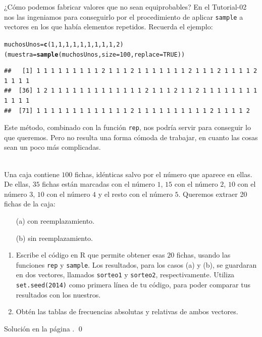 \documentclass[10pt,a4paper]{article}\usepackage[]{graphicx}\usepackage[]{color}
\makeatletter
\newcommand{\hlnum}[1]{\textcolor[rgb]{0.686,0.059,0.569}{#1}}%
\newcommand{\hlstd}[1]{\textcolor[rgb]{0.345,0.345,0.345}{#1}}%
\newcommand{\hlkwb}[1]{\textcolor[rgb]{0.69,0.353,0.396}{#1}}%
\newcommand{\hlkwc}[1]{\textcolor[rgb]{0.333,0.667,0.333}{#1}}%
\newcommand{\hlkwd}[1]{\textcolor[rgb]{0.737,0.353,0.396}{\textbf{#1}}}%
\newenvironment{kframe}{%
 \def\at@end@of@kframe{}%
 \ifinner\ifhmode%
  \def\at@end@of@kframe{\end{minipage}}%
  \begin{minipage}{\columnwidth}%
 \fi\fi%
 \def\FrameCommand##1{\hskip\@totalleftmargin \hskip-\fboxsep
 \colorbox{shadecolor}{##1}\hskip-\fboxsep
     \hskip-\linewidth \hskip-\@totalleftmargin \hskip\columnwidth}%
 \MakeFramed {\advance\hsize-\width
   \@totalleftmargin\z@ \linewidth\hsize
   \@setminipage}}%
 {\par\unskip\endMakeFramed%
 \at@end@of@kframe}
\newenvironment{knitrout}{}{} %
\newcounter {cont01}
\makeatother
\begin{document}
¿Cómo podemos fabricar valores que no sean equiprobables? En el Tutorial-02 nos las ingeniamos para conseguirlo por el procedimiento de aplicar {\tt sample} a vectores en los que había elementos repetidos. Recuerda el ejemplo:
\begin{knitrout}
\color{fgcolor}\begin{kframe}
\begin{alltt}
\hlstd{muchosUnos} \hlkwb{=} \hlkwd{c}\hlstd{(}\hlnum{1}\hlstd{,}\hlnum{1}\hlstd{,}\hlnum{1}\hlstd{,}\hlnum{1}\hlstd{,}\hlnum{1}\hlstd{,}\hlnum{1}\hlstd{,}\hlnum{1}\hlstd{,}\hlnum{1}\hlstd{,}\hlnum{1}\hlstd{,}\hlnum{2}\hlstd{)}
\hlstd{(muestra} \hlkwb{=} \hlkwd{sample}\hlstd{(muchosUnos,} \hlkwc{size}\hlstd{=}\hlnum{100}\hlstd{,} \hlkwc{replace}\hlstd{=}\hlnum{TRUE}\hlstd{) )}
\end{alltt}
\begin{verbatim}
##   [1] 1 1 1 1 1 1 1 1 1 2 1 1 1 2 1 1 1 1 1 1 1 2 1 1 1 2 1 1 1 1 2 1 1 1 1
##  [36] 1 2 1 1 1 1 1 1 1 1 1 1 1 1 1 2 1 1 1 2 1 1 2 1 1 1 1 1 1 1 1 1 1 1 1
##  [71] 1 1 1 1 1 1 1 1 1 1 1 1 1 2 1 1 1 1 1 1 1 1 1 1 2 1 1 1 1 2
\end{verbatim}
\end{kframe}
\end{knitrout}
     
Este método, combinado con la función {\tt rep}, nos podría servir para conseguir lo que queremos. Pero no resulta una forma cómoda de trabajar, en cuanto las cosas sean un poco más complicadas.

\begin{ejercicio}
\label{tut03:ejercicio01}
\quad\\
Una caja contiene $100$ fichas, idénticas salvo por el número que aparece en ellas. De ellas, $35$ fichas están marcadas con el número $1$, $15$ con el número $2$, $10$ con el número $3$, $10$ con el número $4$ y el resto con el número $5$. Queremos extraer 20 fichas de la caja:
     \begin{itemize}
\item[(a)] con reemplazamiento.
\item[(b)] sin reemplazamiento.
\end{itemize}
\begin{enumerate}
\item Escribe el código en R que permite obtener esas $20$ fichas, usando las funciones {\tt rep} y {\tt sample}. Los resultados, para los casos (a) y (b), se guardaran en dos vectores, llamados {\tt sorteo1} y  {\tt sorteo2}, respectivamente. Utiliza {\tt set.seed(2014)} como primera línea de tu código, para poder comparar tus resultados con los nuestros.
\item Obtén las tablas de frecuencias absolutas y relativas de ambos vectores.
\end{enumerate}
Solución en la página \pageref{tut03:ejercicio01:sol}.
\qed
\end{ejercicio}
\end{document}
